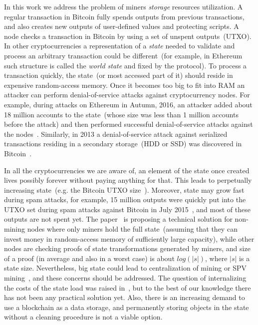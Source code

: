 \documentclass[]{llncs}   %
\begin{document}
In this work we address the problem of miners {\em storage} resources utilization.
A regular transaction in Bitcoin fully spends outputs from previous transactions, and
also creates new outputs of user-defined values and protecting scripts.
A node checks a transaction in
Bitcoin by using a set of unspent outputs~(UTXO). In other cryptocurrencies a
representation of a {\em state} needed to validate and process an arbitrary
transaction could be different~(for example, in Ethereum~\cite{ethyp} such
structure is called the {\em world state} and fixed by the protocol). To process
a transaction quickly, the state~(or most accessed part of it) should reside in
expensive random-access memory. Once it becomes too big to fit into RAM an attacker can
perform denial-of-service attacks against cryptocurrency nodes. For example,
during attacks on Ethereum in Autumn, 2016, an attacker added about 18 million
accounts to the state~(whose size was less than 1 million accounts before the
attack) and then performed successful denial-of-service attacks against the
nodes~\cite{eth2016dos}. Similarly, in 2013 a denial-of-service attack against
serialized transactions residing in a secondary storage~(HDD or SSD) was
discovered in Bitcoin~\cite{vasek2014empirical}.

In all the cryptocurrencies we are aware of, an element of the state once created
lives possibly forever without paying anything for that. This leads to perpetually increasing
state~(e.g. the Bitcoin UTXO size~\cite{utxoChart}). Moreover, state may grow fast during spam attacks, for
example, 15 million outputs were quickly put into the UTXO set during spam attacks
against Bitcoin in July 2015~\cite{bitcoin2015flood}, and most of these outputs
are not spent yet. The paper~\cite{reyzin2016improving} is proposing a technical
solution for non-mining nodes where only miners hold the full state~(assuming
that they can invest money in random-access memory of sufficiently large
capacity), while other nodes are checking proofs of state transformations
generated by miners, and size of a proof (in average and also in a worst case)
is about $log(|s|)$, where $|s|$ is a state size. Nevertheless, big state
could lead to centralization of mining or SPV mining~\cite{spvMining}, and these
concerns should be addressed. The question of internalizing the costs of the
state load
was raised in~\cite{Moeser2015}, but to the best of our knowledge there has not been any
practical solution yet. Also, there is an increasing demand to use a
blockchain as a data storage, and permanently storing objects in the state
without a cleaning procedure is not a viable option.
\end{document}
